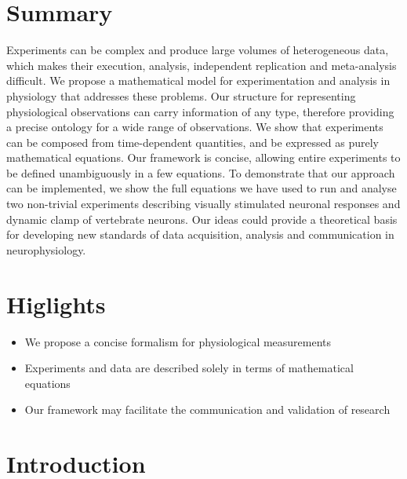 
\section*{Summary}

Experiments can be complex and produce large volumes of heterogeneous
data, which makes their execution, analysis, independent replication
and meta-analysis difficult. We propose a mathematical model for
experimentation and analysis in physiology that addresses these
problems. Our structure for representing physiological observations
can carry information of any type, therefore providing a precise
ontology for a wide range of observations. We show that experiments
can be composed from time-dependent quantities, and be expressed as
purely mathematical equations. Our framework is concise, allowing
entire experiments to be defined unambiguously in a few equations. To
demonstrate that our approach can be implemented, we show the full
equations we have used to run and analyse two non-trivial experiments
describing visually stimulated neuronal responses and dynamic clamp of
vertebrate neurons. Our ideas could provide a theoretical basis for
developing new standards of data acquisition, analysis and
communication in neurophysiology.

\pagebreak

\section*{Higlights}

\begin{itemize}
\item We propose a concise formalism for physiological measurements

\item Experiments and data are described solely in terms of mathematical equations

\item Our framework may facilitate the communication and validation of research
\end{itemize}

\pagebreak

\section*{Introduction}


